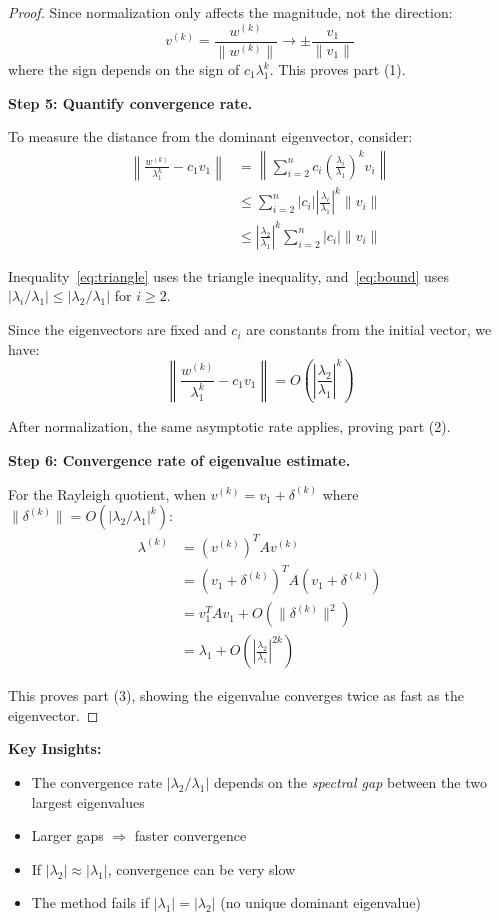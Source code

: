 \documentclass[11pt,a4paper]{article}
\begin{document}
\begin{proof}
Since normalization only affects the magnitude, not the direction:
\begin{equation}
v^{(k)} = \frac{w^{(k)}}{\|w^{(k)}\|} \to \pm \frac{v_1}{\|v_1\|}
\end{equation}
where the sign depends on the sign of $c_1 \lambda_1^k$. This proves part (1).

\textbf{Step 5: Quantify convergence rate.}

To measure the distance from the dominant eigenvector, consider:
\begin{align}
\left\| \frac{w^{(k)}}{\lambda_1^k} - c_1 v_1 \right\| &= \left\| \sum_{i=2}^n c_i \left(\frac{\lambda_i}{\lambda_1}\right)^k v_i \right\| \nonumber \\
&\leq \sum_{i=2}^n |c_i| \left|\frac{\lambda_i}{\lambda_1}\right|^k \|v_i\| \label{eq:triangle} \\
&\leq \left|\frac{\lambda_2}{\lambda_1}\right|^k \sum_{i=2}^n |c_i| \|v_i\| \label{eq:bound}
\end{align}

Inequality~\eqref{eq:triangle} uses the triangle inequality, and~\eqref{eq:bound} uses $|\lambda_i/\lambda_1| \leq |\lambda_2/\lambda_1|$ for $i \geq 2$.

Since the eigenvectors are fixed and $c_i$ are constants from the initial vector, we have:
$$\left\| \frac{w^{(k)}}{\lambda_1^k} - c_1 v_1 \right\| = O\left(\left|\frac{\lambda_2}{\lambda_1}\right|^k\right)$$

After normalization, the same asymptotic rate applies, proving part (2).

\textbf{Step 6: Convergence rate of eigenvalue estimate.}

For the Rayleigh quotient, when $v^{(k)} = v_1 + \delta^{(k)}$ where $\|\delta^{(k)}\| = O(|\lambda_2/\lambda_1|^k)$:
\begin{align}
\lambda^{(k)} &= (v^{(k)})^T A v^{(k)} \nonumber \\
&= (v_1 + \delta^{(k)})^T A (v_1 + \delta^{(k)}) \nonumber \\
&= v_1^T A v_1 + O(\|\delta^{(k)}\|^2) \nonumber \\
&= \lambda_1 + O\left(\left|\frac{\lambda_2}{\lambda_1}\right|^{2k}\right)
\end{align}

This proves part (3), showing the eigenvalue converges twice as fast as the eigenvector.
\end{proof}

\textbf{Key Insights:}
\begin{itemize}
    \item The convergence rate $|\lambda_2/\lambda_1|$ depends on the \emph{spectral gap} between the two largest eigenvalues
    \item Larger gaps $\Rightarrow$ faster convergence
    \item If $|\lambda_2| \approx |\lambda_1|$, convergence can be very slow
    \item The method fails if $|\lambda_1| = |\lambda_2|$ (no unique dominant eigenvalue)
\end{itemize}
\end{document}
